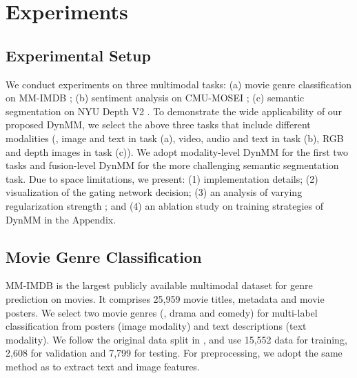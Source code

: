 \section{Experiments} \label{sec.exp}

\subsection{Experimental Setup}
We conduct experiments on three multimodal tasks: (a) movie genre classification on MM-IMDB \cite{imdb}; (b) sentiment analysis on CMU-MOSEI \cite{mosei}; (c) semantic segmentation on NYU Depth V2 \cite{nyu}. To demonstrate the wide applicability of our proposed DynMM, we select the above three tasks that include different modalities (\ie, image and text in task (a), video, audio and text in task (b), RGB and depth images in task (c)). We adopt modality-level DynMM for the first two tasks and fusion-level DynMM for the more challenging semantic segmentation task. Due to space limitations, we present: (1) implementation details; (2) visualization of the gating network decision; (3) an analysis of varying regularization strength ; and (4) an ablation study on training strategies of DynMM in the Appendix.

\subsection{Movie Genre Classification}
MM-IMDB is the largest publicly available multimodal dataset for genre prediction on movies. It comprises 25,959 movie titles, metadata and movie posters. We select two movie genres (\ie, drama and comedy) for multi-label
classification from posters (image modality) and text descriptions (text modality). We follow the original data split in \cite{imdb}, and use 15,552 data for training, 2,608 for validation and 7,799 for testing. For preprocessing, we adopt the same method as \cite{imdb,multibench} to extract text and image features.



